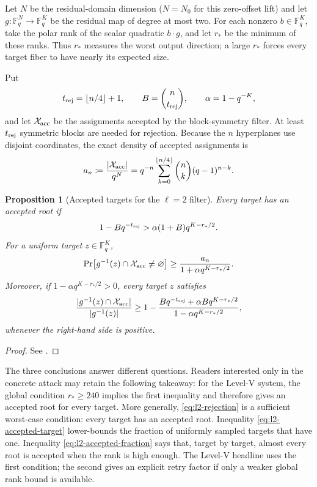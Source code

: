 \documentclass[11pt]{article}
\newtheorem{proposition}[proposition]{Proposition}
\newcommand{\F}{\mathbb F}
\begin{document}
Let $N$ be the residual-domain dimension ($N=N_0$ for this zero-offset lift)
and let $g:\F_q^N\to\F_q^K$ be the residual map of degree at most two.
For each nonzero
$b\in\F_q^K$, take the polar rank of the scalar quadratic $b\cdot g$, and let
$r_*$ be the minimum of these ranks.  Thus $r_*$ measures the worst output
direction; a large $r_*$ forces every target fiber to have nearly its expected
size.

Put
\[
 t_{\rm rej}=\lfloor n/4\rfloor+1,
 \qquad B=\binom n{t_{\rm rej}},
 \qquad \alpha=1-q^{-K},
\]
and let $\mathcal X_{\rm acc}$ be the assignments accepted by the block-symmetry filter.
At least $t_{\rm rej}$ symmetric blocks are needed for rejection.  Because
the $n$ hyperplanes use disjoint coordinates, the exact density of accepted
assignments is
\begin{equation}\label{eq:l2-accepted-density}
 a_n\coloneqq\frac{|\mathcal X_{\rm acc}|}{q^N}
 =q^{-n}\sum_{k=0}^{\lfloor n/4\rfloor}\binom nk(q-1)^{n-k}.
\end{equation}

\begin{proposition}[Accepted targets for the $\ell=2$ filter]\label{prop:l2-rejection}
Every target has an accepted root if
\begin{equation}\label{eq:l2-rejection}
 1-Bq^{-t_{\rm rej}}>\alpha(1+B)q^{K-r_*/2}.
\end{equation}
For a uniform target $z\in\F_q^K$,
\begin{equation}\label{eq:l2-accepted-target}
 \Pr\bigl[g^{-1}(z)\cap\mathcal X_{\rm acc}\ne\varnothing\bigr]
 \ge \frac{a_n}{1+\alpha q^{K-r_*/2}}.
\end{equation}
Moreover, if $1-\alpha q^{K-r_*/2}>0$, every target $z$ satisfies
\begin{equation}\label{eq:l2-accepted-fraction}
 \frac{|g^{-1}(z)\cap\mathcal X_{\rm acc}|}{|g^{-1}(z)|}
 \ge
 1-\frac{Bq^{-t_{\rm rej}}+\alpha Bq^{K-r_*/2}}
          {1-\alpha q^{K-r_*/2}},
\end{equation}
whenever the right-hand side is positive.
\end{proposition}

\begin{proof}
See .
\end{proof}

The three conclusions answer different questions.  Readers interested only
in the concrete attack may retain the following takeaway: for the Level-V
system, the global condition $r_*\ge240$ implies the first inequality and
therefore gives an accepted root for every target.  More generally,
\eqref{eq:l2-rejection} is a sufficient worst-case condition: every target has
an accepted root.  Inequality \eqref{eq:l2-accepted-target} lower-bounds the
fraction of uniformly sampled targets that have one.  Inequality
\eqref{eq:l2-accepted-fraction} says that, target by target, almost every root
is accepted when the rank is high enough.  The Level-V headline uses the first
condition; the second gives an explicit retry factor if only a weaker global
rank bound is available.
\end{document}
